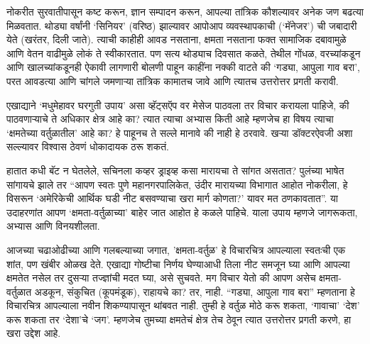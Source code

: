 नोकरीत सुरवातीपासून कष्ट करून, ज्ञान सम्पादन करून, आपल्या तांत्रिक कौशल्यावर अनेक जण बढत्या मिळवतात. थोड्या वर्षांनी ‘सिनियर’ (वरिष्ठ)  झाल्यावर आपोआप व्यवस्थापकाची (‘मॅनेजर’) ची जबादारी येते (खरंतर, दिली जाते). त्याची काहीही आवड नसताना, क्षमता नसताना फक्त सामाजिक दबावामुळे आणि वेतन वाढीमुळे लोकं ते स्वीकारतात. पण सत्य थोड्याच दिवसात कळते, तेथील गोंधळ, वरच्यांकडून आणि खालच्यांकडूनही ऐकावी लागणारी बोलणी पाहून काहींना नक्की वाटते की ‘गड्या, आपुला गाव बरा’, परत आवडत्या आणि चांगले जमणाऱ्या तांत्रिक कामातच जावे आणि त्यातच उत्तरोत्तर प्रगती करावी. 

एखाद्याने ‘मधुमेहावर घरगुती उपाय’ असा व्हॅट्सऍप वर मेसेज पाठवला तर विचार करायला पाहिजे, की पाठवणाऱ्याचे ते अधिकार क्षेत्र आहे का? त्यात त्याचा अभ्यास किती आहे म्हणजेच हा विषय त्याचा ‘क्षमतेच्या वर्तुळातील’ आहे का? हे पाहूनच ते सल्ले  मानावे की नाही हे ठरवावे. खऱ्या डॉक्टरऐवजी अशा सल्ल्यावर विश्वास ठेवणं धोकादायक ठरू शकतं.

हातात कधी बॅट न घेतलेले, सचिनला कव्हर ड्राइव्ह कसा मारायचा ते सांगत असतात? पुलंच्या भाषेत सांगायचे झाले तर “आपण स्वतः पुणे महानगरपालिकेत, उंदीर मारायच्या विभागात आहोत नोकरीला, हे विसरून ‘अमेरिकेची आर्थिक घडी नीट बसवण्याचा खरा मार्ग कोणता?’ यावर  मत ठणकावतात”. या उदाहरणांत आपण ‘क्षमता-वर्तुळाच्या’ बाहेर जात आहोत हे कळले पाहिचे. याला उपाय म्हणजे जागरूकता, अभ्यास आणि विनयशीलता. 

आजच्या चढाओढीच्या आणि गलबल्याच्या जगात, ’क्षमता-वर्तुळ’ हे विचारचित्र आपल्याला स्वतःची एक शांत, पण खंबीर ओळख देते. एखाद्या गोष्टीचा निर्णय घेण्याआधी तिला नीट समजून घ्या आणि आपल्या क्षमतेत नसेल तर दुसऱ्या तज्ज्ञांची मदत घ्या, असे सुचवते. मग विचार येतो की आपण असेच क्षमता-वर्तुळात अडकून, संकुचित (कूपमंडूक), राहायचे का? तर, नाही.  “गड्या, आपुला गाव बरा” म्हणताना  हे विचारचित्र आपल्याला नवीन शिकण्यापासून थांबवत नाही. तुम्ही हे वर्तुळ मोठे करू शकता, ‘गावाचा’ ‘देश’ करू शकता तर ‘देशा’चे ‘जग’. म्हणजेच तुमच्या क्षमतेचं क्षेत्र तेच ठेवून त्यात उत्तरोत्तर प्रगती करणे, हा खरा उद्देश आहे. 

